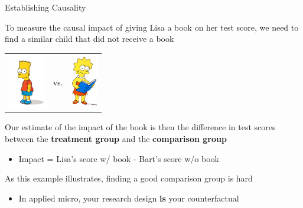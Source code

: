 \documentclass[10pt,xcolor=table,ignorenonframetext,handout,aspectratio=169]{beamer}
\newlength{\wideitemsep}
\let\olditem\item
\renewcommand{\item}{\setlength{\itemsep}{\wideitemsep}\olditem}
\begin{document}
\begin{frame}{Establishing Causality}

\medskip
To measure the causal impact of giving Lisa a book on her test score, 
we need to find a similar child that did not receive a book

\begin{center}
	\begin{tabular}{ccc}
		\includegraphics[height=2.4cm]{img/bart.png} & vs. & \includegraphics[height=2.2cm]{img/lisa-book.jpg}
	\end{tabular}
\end{center}

Our estimate of the impact of the book is then the difference in test scores between the \textbf{treatment group} and the \textbf{comparison group}

\medskip
\begin{itemize}
	
	\item
	Impact = Lisa's score w/ book - Bart's score w/o book
	
\end{itemize}

\pause
\medskip
As this example illustrates, finding a good comparison group is hard

\medskip
\begin{itemize}
	
	\item
	In applied micro, your research design \textbf{is} your counterfactual
	
\end{itemize}

\end{frame}


\end{document}

